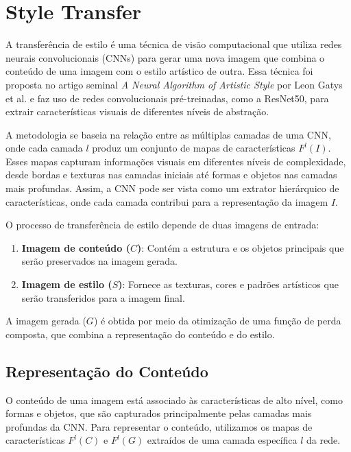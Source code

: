 \documentclass{tufte-handout}
\begin{document}
\section{Style Transfer}

\begin{defn}
A transferência de estilo é uma técnica de visão computacional que utiliza redes neurais convolucionais (CNNs) para gerar uma nova imagem que combina o conteúdo de uma imagem com o estilo artístico de outra. Essa técnica foi proposta no artigo seminal \textit{A Neural Algorithm of Artistic Style} por Leon Gatys et al. e faz uso de redes convolucionais pré-treinadas, como a ResNet50, para extrair características visuais de diferentes níveis de abstração.
\end{defn}

A metodologia se baseia na relação entre as múltiplas camadas de uma CNN, onde cada camada $l$ produz um conjunto de mapas de características $F^{l}(I)$. Esses mapas capturam informações visuais em diferentes níveis de complexidade, desde bordas e texturas nas camadas iniciais até formas e objetos nas camadas mais profundas. Assim, a CNN pode ser vista como um extrator hierárquico de características, onde cada camada contribui para a representação da imagem $I$.

O processo de transferência de estilo depende de duas imagens de entrada:
\begin{enumerate}
    \item \textbf{Imagem de conteúdo ($C$)}: Contém a estrutura e os objetos principais que serão preservados na imagem gerada.
    \item \textbf{Imagem de estilo ($S$)}: Fornece as texturas, cores e padrões artísticos que serão transferidos para a imagem final.
\end{enumerate}


A imagem gerada ($G$) é obtida por meio da otimização de uma função de perda composta, que combina a representação do conteúdo e do estilo.

\subsection{Representação do Conteúdo}

O conteúdo de uma imagem está associado às características de alto nível, como formas e objetos, que são capturados principalmente pelas camadas mais profundas da CNN. Para representar o conteúdo, utilizamos os mapas de características $F^l(C)$ e $F^l(G)$ extraídos de uma camada específica $l$ da rede.
\end{document}
